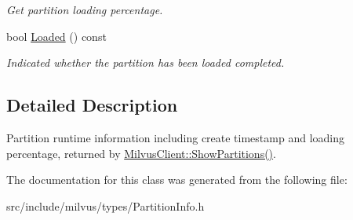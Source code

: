 \begin{DoxyCompactItemize}
\begin{DoxyCompactList}\small\item\em Get partition loading percentage. \end{DoxyCompactList}\item 
\mbox{\label{classmilvus_1_1_partition_info_ae104eecfb6d501a19e77ff1ee3e28e5d}} 
bool \hyperlink{classmilvus_1_1_partition_info_ae104eecfb6d501a19e77ff1ee3e28e5d}{Loaded} () const
\begin{DoxyCompactList}\small\item\em Indicated whether the partition has been loaded completed. \end{DoxyCompactList}\end{DoxyCompactItemize}


\subsection{Detailed Description}
Partition runtime information including create timestamp and loading percentage, returned by \hyperlink{classmilvus_1_1_milvus_client_a12b481158b57a806f8d341178348f735}{Milvus\+Client\+::\+Show\+Partitions()}. 

The documentation for this class was generated from the following file\+:\begin{DoxyCompactItemize}
\item 
src/include/milvus/types/Partition\+Info.\+h\end{DoxyCompactItemize}
